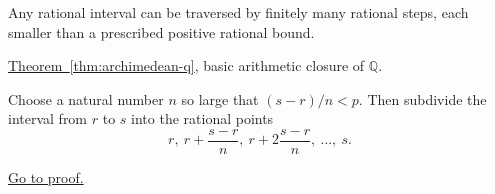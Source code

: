 \begin{remark*}[Interpretation]
Any rational interval can be traversed by finitely many rational steps, each
smaller than a prescribed positive rational bound.
\end{remark*}

\begin{remark*}[Dependencies]
\hyperref[thm:archimedean-q]{Theorem~\ref*{thm:archimedean-q}},
basic arithmetic closure of $\mathbb{Q}$.
\end{remark*}

\begin{remark*}
Choose a natural number $n$ so large that $(s-r)/n<p$. Then subdivide the
interval from $r$ to $s$ into the rational points
\[
r,\ r+\frac{s-r}{n},\ r+2\frac{s-r}{n},\ \dots,\ s.
\]
\end{remark*}

\begin{remark*}[Proof]
\hyperref[prf:rational-chain-with-small-steps]{Go to proof.}
\end{remark*}
